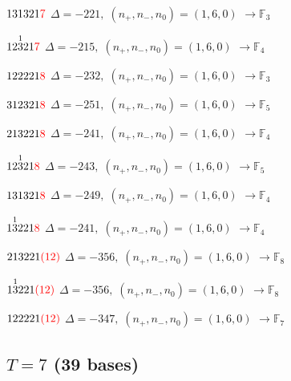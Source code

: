 \documentclass[10pt]{article}
\begin{document}
$131321\textcolor{red}{7}$ \quad $\Delta=-221,\; (n_+,n_-,n_0)=(1,6,0)$ \quad $\to \mathbb{F}_{3}$

\smallskip

$12\overset{1}{3}21\textcolor{red}{7}$ \quad $\Delta=-215,\; (n_+,n_-,n_0)=(1,6,0)$ \quad $\to \mathbb{F}_{4}$

\smallskip

$122221\textcolor{red}{8}$ \quad $\Delta=-232,\; (n_+,n_-,n_0)=(1,6,0)$ \quad $\to \mathbb{F}_{3}$

\smallskip

$312321\textcolor{red}{8}$ \quad $\Delta=-251,\; (n_+,n_-,n_0)=(1,6,0)$ \quad $\to \mathbb{F}_{5}$

\smallskip

$213221\textcolor{red}{8}$ \quad $\Delta=-241,\; (n_+,n_-,n_0)=(1,6,0)$ \quad $\to \mathbb{F}_{4}$

\smallskip

$12\overset{1}{3}21\textcolor{red}{8}$ \quad $\Delta=-243,\; (n_+,n_-,n_0)=(1,6,0)$ \quad $\to \mathbb{F}_{5}$

\smallskip

$131321\textcolor{red}{8}$ \quad $\Delta=-249,\; (n_+,n_-,n_0)=(1,6,0)$ \quad $\to \mathbb{F}_{4}$

\smallskip

$1\overset{1}{3}221\textcolor{red}{8}$ \quad $\Delta=-241,\; (n_+,n_-,n_0)=(1,6,0)$ \quad $\to \mathbb{F}_{4}$

\smallskip

$213221\textcolor{red}{(12)}$ \quad $\Delta=-356,\; (n_+,n_-,n_0)=(1,6,0)$ \quad $\to \mathbb{F}_{8}$

\smallskip

$1\overset{1}{3}221\textcolor{red}{(12)}$ \quad $\Delta=-356,\; (n_+,n_-,n_0)=(1,6,0)$ \quad $\to \mathbb{F}_{8}$

\smallskip

$122221\textcolor{red}{(12)}$ \quad $\Delta=-347,\; (n_+,n_-,n_0)=(1,6,0)$ \quad $\to \mathbb{F}_{7}$


\subsection*{$T = 7$ \quad (39 bases)}
\smallskip
\end{document}
